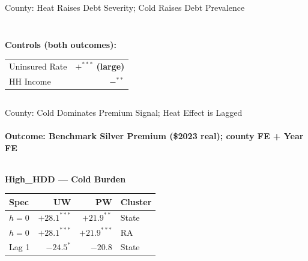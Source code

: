 \documentclass[aspectratio=169,11pt]{beamer}
\newcommand{\emphcolor}[1]{{\color{WarmOrange}\textbf{#1}}}
\newcommand{\tealtext}[1]{{\color{Teal}#1}}
\begin{document}
\begin{frame}{County: Heat Raises Debt Severity; Cold Raises Debt Prevalence}
\begin{columns}[T]
\begin{column}{0.47\textwidth}
\begin{tabular}{lccc}
        \bottomrule
      \end{tabular}
      \vspace{0.4em}
      \textbf{Controls (both outcomes):}\\
      \begin{tabular}{lr}
        Uninsured Rate & \emphcolor{$+^{***}$ (large)} \\
        HH Income & \emphcolor{$-^{**}$} \\
      \end{tabular}
    \end{column}
  \end{columns}
\end{frame}

\begin{frame}{County: Cold Dominates Premium Signal; Heat Effect is Lagged}
  \framesubtitle{Outcome: Benchmark Silver Premium (\$2023 real); county FE + Year FE}
  \small
  \begin{columns}[T]
    \begin{column}{0.47\textwidth}
      \tealtext{\textbf{High\_HDD — Cold Burden}}\\[0.25em]
      \begin{tabular}{lrrl}
        \toprule
        Spec & UW & PW & Cluster \\
        \midrule
        $h{=}0$ & \emphcolor{$+28.1^{***}$} & \emphcolor{$+21.9^{**}$} & State \\
        $h{=}0$ & \emphcolor{$+28.1^{***}$} & \emphcolor{$+21.9^{***}$} & RA \\
        Lag 1   & $-24.5^{*}$ & $-20.8$ & State \\
        \bottomrule
      \end{tabular}
      \vspace{0.5em}


\end{column}
\end{columns}
\end{frame}
\end{document}
